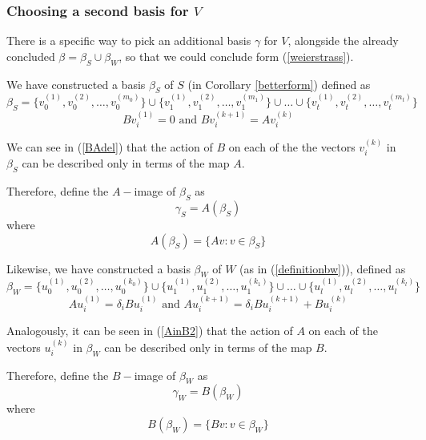 \subsubsection{Choosing a second basis for $V$}
There is a specific way to pick an additional basis $\gamma$ for $V$, alongside the already concluded $\beta=\beta_S\cup \beta_W$, so that we could conclude form (\ref{weierstrass}). 

We have constructed a basis $\beta_S$ of $S$ (in Corollary \ref{betterform}) defined as \begin{equation}
\beta_S=\{v_{0}^{(1)},v_{0}^{(2)},\dots,v_{0}^{(m_0)}\} \cup \{v_{1}^{(1)},v_{1}^{(2)},\dots,v_{1}^{(m_1)}\} \cup \dots \cup \{v_{t}^{(1)},v_{t}^{(2)},\dots,v_{t}^{(m_t)}\} \label{eq:vbasis}
 \end{equation}
\begin{equation}\label{BAdel}
   Bv_{i}^{(1)}=0 \text{ and } Bv_{i}^{(k+1)}=Av_{i}^{(k)}
\end{equation}


We can see in (\ref{BAdel}) that the action of $B$ on each of the the vectors $v_i^{(k)}$ in $\beta_S$ can be described only in terms of the map $A$.



Therefore, define the $A-$image of $\beta_S$ as $$\boxed{\gamma_S=A(\beta_S)}$$ where 
\begin{equation}
    A(\beta_S)=\{Av:v\in \beta_S\}
\end{equation}

Likewise, we have constructed a basis $\beta_W$ of $W$ (as in (\ref{definitionbw})), defined as
  \begin{equation}
\beta_W=\{u_{0}^{(1)},u_{0}^{(2)},\dots,u_{0}^{(k_0)}\} \cup \{u_{1}^{(1)},u_{1}^{(2)},\dots,u_{1}^{(k_1)}\} \cup \dots \cup \{u_{l}^{(1)},u_{l}^{(2)},\dots,u_{l}^{(k_l)}\}  \label{eq:vbasis22}
 \end{equation} 
  \begin{equation}\label{AinB2}
        Au_{i}^{(1)}=\delta_i Bu_{i}^{(1)}\text{ and }Au_{i}^{(k+1)}=\delta_i Bu_{i}^{(k+1)}+Bu_{i}^{(k)}
    \end{equation}

Analogously, it can be seen in (\ref{AinB2}) that the action of $A$ on each of the vectors $u_i^{(k)}$ in $\beta_W$ can be described only in terms of the map $B$.

Therefore, define the $B-$image of $\beta_W$ as $$\boxed{\gamma_W=B(\beta_W)}$$ where
\begin{equation}
    B(\beta_W)=\{Bv:v\in \beta_W\}
\end{equation}

